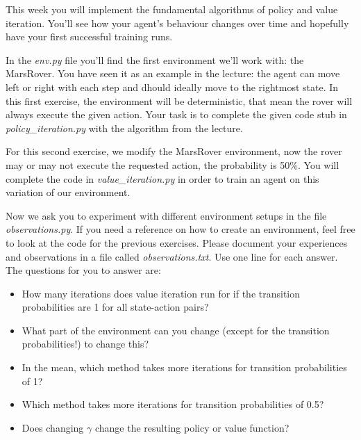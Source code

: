 \documentclass{exam}
\begin{document}
\noindent
This week you will implement the fundamental algorithms of policy and value iteration. You'll see how your agent's behaviour changes over time and hopefully have your first successful training runs.

\begin{questions}
	In the \emph{env.py} file you'll find the first environment we'll work with: the MarsRover. You have seen it as an example in the lecture: the agent can move left or right with each step and dhould ideally move to the rightmost state. 
	In this first exercise, the environment will be deterministic, that mean the rover will always execute the given action. 
	Your task is to complete the given code stub in \emph{policy\_iteration.py} with the algorithm from the lecture.
	
	For this second exercise, we modify the MarsRover environment, now the rover may or may not execute the requested action, the probability is 50\%. You will complete the code in \emph{value\_iteration.py} in order to train an agent on this variation of our environment.
	
	Now we ask you to experiment with different environment setups in the file \emph{observations.py}. If you need a reference on how to create an environment, feel free to look at the code for the previous exercises.
	Please document your experiences and observations in a file called \emph{observations.txt}. Use one line for each answer. The questions for you to answer are:
	\begin{itemize}
		\item How many iterations does value iteration run for if the transition probabilities are 1 for all state-action pairs?
		\item What part of the environment can you change (except for the transition probabilities!) to change this?
		\item In the mean, which method takes more iterations for transition probabilities of 1?
		\item Which method takes more iterations for transition probabilities of 0.5?
		\item Does changing $\gamma$ change the resulting policy or value function?
	\end{itemize}
\end{questions}
\end{document}
